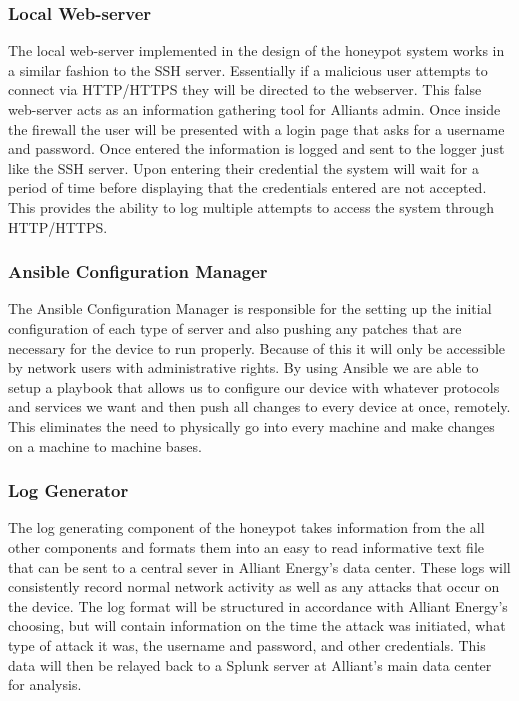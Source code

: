 \subsubsection{Local Web-server}
The local web-server implemented in the design of the honeypot system works in a similar fashion to the SSH server. Essentially if a malicious user attempts to connect via HTTP/HTTPS they will be directed to the webserver.  This false web-server acts as an information gathering tool for Alliants admin.  Once inside the firewall the user will be presented with a login page that asks for a username and password.  Once entered the information is logged and sent to the logger just like the SSH server.  Upon entering their credential the system will wait for a period of time before displaying that the credentials entered are not accepted.  This provides the ability to log multiple attempts to access the system through HTTP/HTTPS.

\subsubsection{Ansible Configuration Manager}
The Ansible Configuration Manager is responsible for the setting up the initial configuration of each type of server and also pushing any patches that are necessary for the device to run properly.  Because of this it will only be accessible by network users with administrative rights. By using Ansible we are able to setup a playbook that allows us to configure our device with whatever protocols and services we want and then push all changes to every device at once, remotely.  This eliminates the need to physically go into every machine and make changes on a machine to machine bases.

\subsubsection{Log Generator}
The log generating component of the honeypot takes information from the all other components and formats them into an easy to read informative text file that can be sent to a central sever in Alliant Energy's data center.  These logs will consistently record normal network activity as well as any attacks that occur on the device.  The log format will be structured in accordance with Alliant Energy's choosing, but will contain information on the time the attack was initiated, what type of attack it was, the username and password, and other credentials.  This data will then be relayed back to a Splunk server at Alliant's main data center for analysis.

